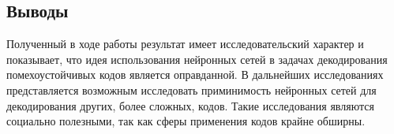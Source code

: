 \subsection{Выводы}\label{subsec:conclusions}

Полученный в ходе работы результат имеет исследовательский характер и показывает, что идея использования нейронных сетей в задачах декодирования помехоустойчивых кодов является оправданной. В дальнейших исследованиях представляется возможным исследовать приминимость нейронных сетей для декодирования других, более сложных, кодов. Такие исследования являются социально полезными, так как сферы применения кодов крайне обширны.

\newpage 
